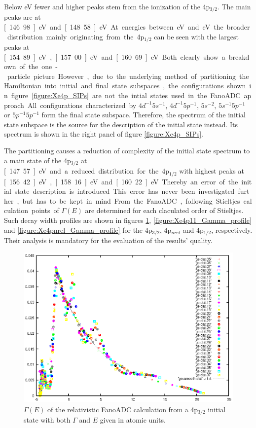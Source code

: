 Below \unit[150]{eV} fewer and higher peaks stem from the ionization of the
4p$_{3/2}$. The main peaks are at \unit[146.98]{eV} and \unit[148.58]{eV}.
At energies between \unit[150]{eV} and \unit[165]{eV} the broader
distribution mainly originating from the 4p$_{1/2}$ can be seen with the largest
peaks at \unit[154.89]{eV}, \unit[157.00]{eV} and \unit[160.69]{eV}. Both clearly
show a breakdown of the one-particle picture.

However, due to the underlying method of partitioning the Hamiltonian into
initial and final state subspaces, the configurations shown in figure
\ref{figure:Xe4p_SIPs} are not the intial states used in the FanoADC approach.
All configurations characterized by $4d^{-1}5s^{-1}$, $4d^{-1}5p^{-1}$,
$5s^{-2}$, $5s^{-1}5p^{-1}$ or $5p^{-1}5p^{-1}$ form the final state subspace.
Therefore, the spectrum of the initial state subspace is the source for
the description of the initial state instead. Its spectrum is shown in
the right panel of figure \ref{figure:Xe4p_SIPs}.

The partitioning causes a reduction of complexity of the initial state
spectrum to a main state of the 4p$_{3/2}$ at \unit[147.57]{eV} and a
reduced distribution for
the 4p$_{1/2}$ with highest peaks at \unit[156.42]{eV}, \unit[158.16]{eV}
and \unit[160.22]{eV}.
Thereby an error of the initial state description is introduced.
This error has never been investigated further, but has to be kept in mind.

From the FanoADC, following Stieltjes calculation points of $\Gamma(E)$ are
determined for each claculated order of Stieltjes. Such decay width profiles
are shown in figures \ref{figure:Xe4p33_Gamma_profile},
\ref{figure:Xe4p11_Gamma_profile} and \ref{figure:Xe4pnrel_Gamma_profile}
for the 4p$_{3/2}$, 4p$_{nrel}$ and 4p$_{1/2}$, respectively.
Their analysis is mandatory for the evaluation of the results' quality.

\begin{figure}[htb]
  \centering
  \includegraphics[scale=1.0]{pics/Xe4p_33_gammae.eps}
  \caption{$\Gamma(E)$ of the relativistic FanoADC calculation from a 4p$_{3/2}$
           initial state with both $\Gamma$ and $E$ given in atomic units.
           }
  \label{figure:Xe4p33_Gamma_profile}
\end{figure}

